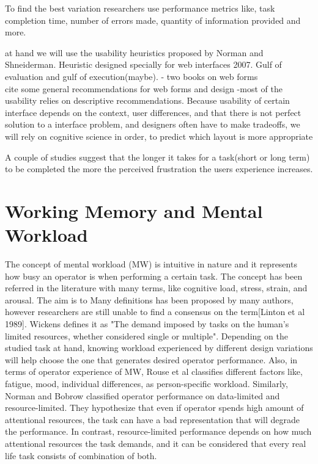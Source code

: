 \documentclass[a4paper]{report}
\begin{document}
		 
			
			To find the best variation researchers use performance metrics like, task completion time, number of errors made, quantity of information provided and more.
		
			
			at hand we will use the usability heuristics proposed by Norman\cite{nielsen1994usability,nielsen1990heuristic} and Shneiderman\cite{shneiderman1992designing}. Heuristic designed specially for web interfaces 2007. Gulf of evaluation and gulf of execution(maybe).  - two books on web forms\\
			cite some general recommendations for web forms and design
			-most of the usability relies on descriptive recommendations.
			Because usability of certain interface depends on the context, user differences, and that there is not perfect solution to a interface problem, and designers often have to make tradeoffs, we will rely on cognitive science in order, to predict which layout is more appropriate
			
			A couple of studies suggest that the longer it takes for a task(short or long term) to be completed the more the perceived frustration the users experience increases\cite{mendoza2005usability,bessiere2004social}.
		
	\section{Working Memory and Mental Workload}
		The concept of mental workload (MW) is intuitive in nature and it represents how busy an operator is when performing a certain task. The concept has been referred in the literature with many terms, like cognitive load, stress, strain, and arousal. The aim is to Many definitions has been proposed by many authors, however researchers are still unable to find a consensus on the term[Linton et al 1989]. Wickens\cite{wickens2008multiple} defines it as "The demand imposed by tasks on the human's limited resources, whether considered single or multiple". Depending on the studied task at hand, knowing workload experienced by different design variations will help choose the one that generates desired operator performance. Also, in terms of operator experience of MW, Rouse et al classifies different factors like, fatigue, mood, individual differences, as person-specific workload\cite{rouse1993modeling}. Similarly, Norman and Bobrow classified operator performance on data-limited and resource-limited\cite{norman1975data}. They hypothesize that even if operator spends high amount of attentional resources, the task can have a bad representation that will degrade the performance. In contrast, resource-limited performance depends on how much attentional resources the task demands, and it can be considered that every real life task consists of combination of both. 
\end{document}
